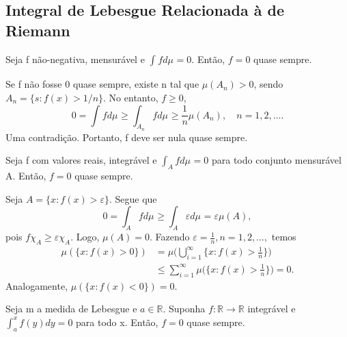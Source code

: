 \documentclass[MeasureTheory/measure_theory.tex]{subfiles}
\begin{document}
\subsection{Integral de Lebesgue Relacionada à de Riemann}
\begin{prop*}
	Seja f não-negativa, mensurável e \(\int_{}f d\mu_{} = 0.\) Então, \(f=0\) quase sempre.
\end{prop*}
\begin{proof*}
	Se f não fosse 0 quase sempre, existe n tal que \(\mu (A_{n}) > 0\), sendo \(A_{n} = \{s: f(x) > 1/n\}\). No entanto, \(f\geq 0\),
	\[
		0 = \int_{}f d\mu_{} \geq \int_{A_{n}}f d\mu_{} \geq \frac{1}{n}\mu (A_{n}),\quad n = 1, 2, \dotsc .
	\]
	Uma contradição. Portanto, f deve ser nula quase sempre. \qedsymbol
\end{proof*}
\begin{prop*}
	Seja f com valores reais, integrável  e \(\int_{A}f d\mu_{} = 0\) para todo conjunto mensurável A. Então, \(f=0\) quase sempre.
\end{prop*}
\begin{proof*}
	Seja \(A = \{x: f(x) > \varepsilon \}.\) Segue que
	\[
		0 = \int_{A}f d\mu_{} \geq \int_{A}\varepsilon  d\mu_{} = \varepsilon \mu (A),
	\]
	pois \(f \chi_{A} \geq \varepsilon \chi_{A}\). Logo, \(\mu (A) = 0\). Fazendo \(\varepsilon  = \frac{1}{n}, n = 1, 2, \dotsc ,\) temos
	\begin{align*}
		\mu (\{x:f(x) > 0\}) & = \mu \biggl(\bigcup_{i=1}^{\infty}\biggl\{x: f(x) > \frac{1}{n}\biggr\}\biggr)          \\
		                     & \leq \sum\limits_{i=1}^{\infty}\mu \biggl(\biggl\{x:f(x)>\frac{1}{n}\biggr\}\biggr) = 0.
	\end{align*}
	Analogamente, \(\mu (\{x:f(x)<0\}) = 0.\) \qedsymbol
\end{proof*}
\begin{crl*}
	Seja m a medida de Lebesgue e \(a\in \mathbb{R}\). Suponha \(f:\mathbb{R}\rightarrow \mathbb{R}\) integrável e \(\int_{a}^{x}f(y)dy = 0\) para todo x. Então, \(f=0\) quase sempre.
\end{crl*}
\end{document}

